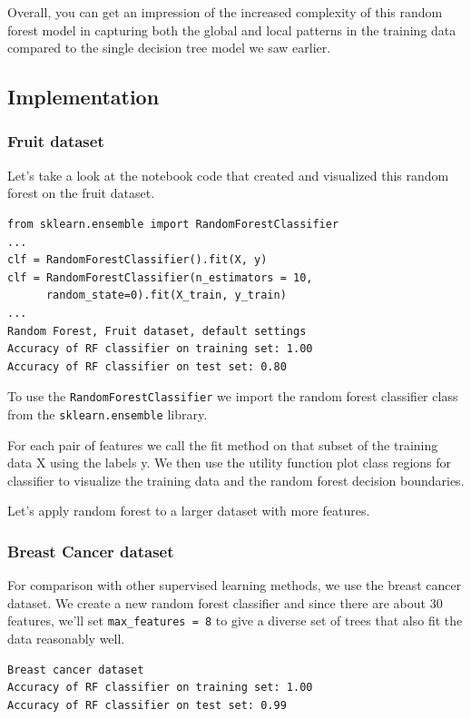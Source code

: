 \begin{multicols}{2}
Overall, you can get an impression of the increased complexity of this random forest model in capturing both the global and local patterns in the training data compared to the single decision tree model we saw earlier. 

\subsection{Implementation}

\subsubsection*{Fruit dataset}

Let's take a look at the notebook code that created and visualized this random forest on the fruit dataset.
{\scriptsize
\begin{verbatim}
from sklearn.ensemble import RandomForestClassifier
...
clf = RandomForestClassifier().fit(X, y)
clf = RandomForestClassifier(n_estimators = 10,
      random_state=0).fit(X_train, y_train)
...
Random Forest, Fruit dataset, default settings
Accuracy of RF classifier on training set: 1.00
Accuracy of RF classifier on test set: 0.80
\end{verbatim}
}

To use the \texttt{RandomForestClassifier} we import the random forest classifier class from the \texttt{sklearn.ensemble} library. 

For each pair of features we call the fit method on that subset of the training data X using the labels y. We then use the utility function plot class regions for classifier to visualize the training data and the random forest decision boundaries. 

Let's apply random forest to a larger dataset with more features. 

\subsubsection*{Breast Cancer dataset}

For comparison with other supervised learning methods, we use the breast cancer dataset. We create a new random forest classifier and since there are about 30 features, we'll set \texttt{max_features~=~8} to give a diverse set of trees that also fit the data reasonably well. 

{\scriptsize
\begin{verbatim}
Breast cancer dataset
Accuracy of RF classifier on training set: 1.00
Accuracy of RF classifier on test set: 0.99
\end{verbatim}
}


\end{multicols}
